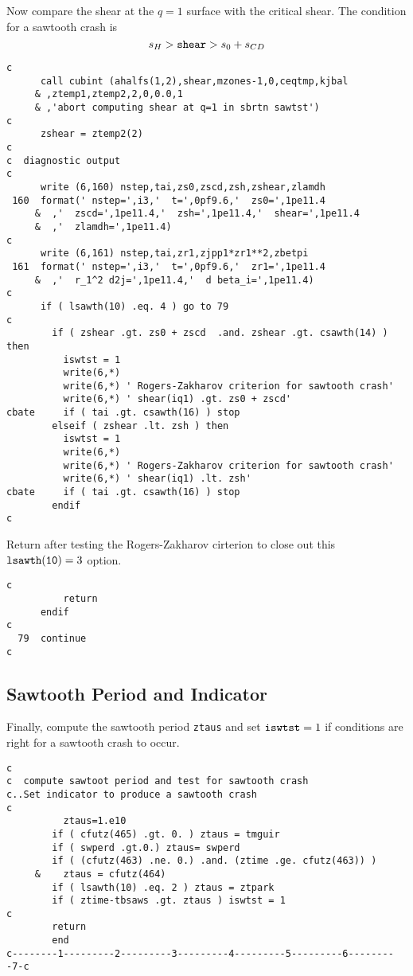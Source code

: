 Now compare the shear at the $q=1$ surface with the critical shear.
The condition for a sawtooth crash is
$$ s_H > {\tt shear} > s_0 + s_{CD} $$
\begin{verbatim}
c
      call cubint (ahalfs(1,2),shear,mzones-1,0,ceqtmp,kjbal
     & ,ztemp1,ztemp2,2,0,0.0,1
     & ,'abort computing shear at q=1 in sbrtn sawtst')
c
      zshear = ztemp2(2)
c
c  diagnostic output
c
      write (6,160) nstep,tai,zs0,zscd,zsh,zshear,zlamdh
 160  format(' nstep=',i3,'  t=',0pf9.6,'  zs0=',1pe11.4
     &  ,'  zscd=',1pe11.4,'  zsh=',1pe11.4,'  shear=',1pe11.4
     &  ,'  zlamdh=',1pe11.4)
c
      write (6,161) nstep,tai,zr1,zjpp1*zr1**2,zbetpi
 161  format(' nstep=',i3,'  t=',0pf9.6,'  zr1=',1pe11.4
     &  ,'  r_1^2 d2j=',1pe11.4,'  d beta_i=',1pe11.4)
c
      if ( lsawth(10) .eq. 4 ) go to 79
c
        if ( zshear .gt. zs0 + zscd  .and. zshear .gt. csawth(14) ) then
          iswtst = 1
          write(6,*)
          write(6,*) ' Rogers-Zakharov criterion for sawtooth crash'
          write(6,*) ' shear(iq1) .gt. zs0 + zscd'
cbate     if ( tai .gt. csawth(16) ) stop
        elseif ( zshear .lt. zsh ) then
          iswtst = 1
          write(6,*)
          write(6,*) ' Rogers-Zakharov criterion for sawtooth crash'
          write(6,*) ' shear(iq1) .lt. zsh'
cbate     if ( tai .gt. csawth(16) ) stop
        endif
c
\end{verbatim}

Return after testing the Rogers-Zakharov cirterion to close out this
${\tt lsawth(10)} = 3$ option.
\begin{verbatim}
c
          return
      endif
c
  79  continue
c
\end{verbatim}

\subsection{Sawtooth Period and Indicator}

Finally, compute the sawtooth period {\tt ztaus}
and set ${\tt iswtst} = 1$ if conditions are right for a sawtooth crash
to occur.

\begin{verbatim}
c
c  compute sawtoot period and test for sawtooth crash
c..Set indicator to produce a sawtooth crash
c
          ztaus=1.e10
        if ( cfutz(465) .gt. 0. ) ztaus = tmguir
        if ( swperd .gt.0.) ztaus= swperd
        if ( (cfutz(463) .ne. 0.) .and. (ztime .ge. cfutz(463)) )
     &    ztaus = cfutz(464)
        if ( lsawth(10) .eq. 2 ) ztaus = ztpark
        if ( ztime-tbsaws .gt. ztaus ) iswtst = 1
c
        return
        end
c--------1---------2---------3---------4---------5---------6---------7-c
\end{verbatim}

